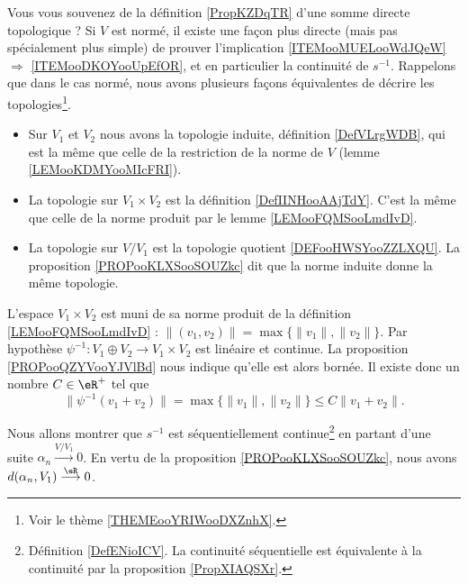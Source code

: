 \begin{normaltext}        \label{NORMooUDZOooKxAPit}
	Vous vous souvenez de la définition \ref{PropKZDqTR} d'une somme directe topologique ?  Si \( V\) est normé, il existe une façon plus directe (mais pas spécialement plus simple) de prouver l'implication \ref{ITEMooMUELooWdJQeW} \( \Rightarrow\) \ref{ITEMooDKOYooUpEfOR}, et en particulier la continuité de \( s^{-1}\).
	Rappelons que dans le cas normé, nous avons plusieurs façons équivalentes de décrire les topologies\footnote{Voir le thème \ref{THEMEooYRIWooDXZnhX}.}.
	\begin{itemize}
		\item Sur \( V_1\) et \( V_2\) nous avons la topologie induite, définition \ref{DefVLrgWDB}, qui est la même que celle de la restriction de la norme de \( V\) (lemme \ref{LEMooKDMYooMIcFRI}).
		\item La topologie sur \( V_1\times V_2\) est la définition \ref{DefIINHooAAjTdY}. C'est la même que celle de la norme produit par le lemme \ref{LEMooFQMSooLmdIvD}.
		\item La topologie sur \( V/V_1\) est la topologie quotient \ref{DEFooHWSYooZZLXQU}. La proposition \ref{PROPooKLXSooSOUZkc} dit que la norme induite donne la même topologie.
	\end{itemize}

	L'espace \( V_1\times V_2\) est muni de sa norme produit de la définition \ref{LEMooFQMSooLmdIvD} : \( \| (v_1,v_2) \|=\max\{ \| v_1 \|, \| v_2 \| \}\). Par hypothèse \( \psi^{-1}\colon V_1\oplus V_2\to V_1\times V_2\) est linéaire et continue. La proposition \ref{PROPooQZYVooYJVlBd} nous indique qu'elle est alors bornée. Il existe donc un nombre \( C\in \eR^+\) tel que
	\begin{equation}
		\| \psi^{-1}(v_1+v_2) \|=\max\{ \| v_1 \|,\| v_2 \| \}\leq C\| v_1+v_2 \|.
	\end{equation}

	Nous allons montrer que \( s^{-1}\) est séquentiellement continue\footnote{Définition \ref{DefENioICV}. La continuité séquentielle est équivalente à la continuité par la proposition \ref{PropXIAQSXr}.} en partant d'une suite \( \alpha_n\stackrel{V/V_1}{\longrightarrow}0\). En vertu de la proposition \ref{PROPooKLXSooSOUZkc}, nous avons \( d(\alpha_n,V_1)\stackrel{\eR}{\longrightarrow}0\).


\end{normaltext}
